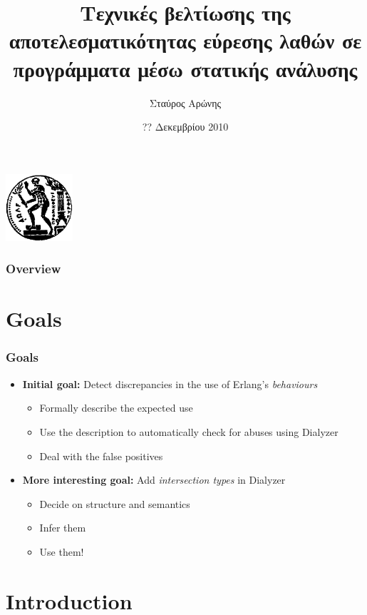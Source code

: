 \documentclass{beamer}
\title[Διπλωματική εργασία]
      {Τεχνικές βελτίωσης της αποτελεσματικότητας εύρεσης λαθών
       σε προγράμματα μέσω στατικής ανάλυσης}
\author{Σταύρος Αρώνης}
\date{?? Δεκεμβρίου 2010}
\institute{Διπλωματική εργασία\\Σχολή ΗΜΜΥ, ΕΜΠ}
\begin{document}
\begin{frame}
  \titlepage
  \begin{center}
    \includegraphics[width=2.5cm]{pyrforos}
  \end{center}
\end{frame}

\begin{frame}
  \frametitle{Overview}
  \tableofcontents[hidesubsections]
\end{frame}

\section{Goals}

\begin{frame}
  \frametitle{Goals}
  \begin{itemize}
  \item \textbf{Initial goal:} Detect discrepancies in the use of
    Erlang's \emph{behaviours} \pause
    \begin{itemize}
    \item Formally describe the expected use \pause
    \item Use the description to automatically check for abuses using
      Dialyzer \pause
    \item Deal with the false positives
    \end{itemize}
    \pause
  \item \textbf{More interesting goal:} Add \emph{intersection types}
    in Dialyzer \pause
    \begin{itemize}
    \item Decide on structure and semantics \pause
    \item Infer them \pause
    \item Use them!
    \end{itemize}
  \end{itemize}
\end{frame}

\section{Introduction}
\end{document}

